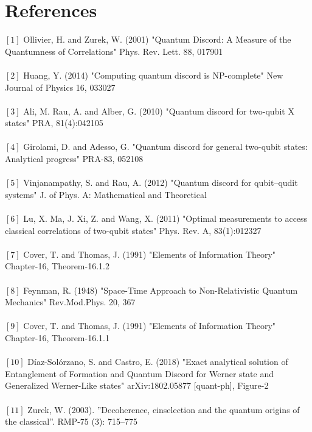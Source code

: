 \documentclass[8pt]{article}
\begin{document}
\section{References}
$[1]$ Ollivier, H. and Zurek, W. (2001) "Quantum Discord: A Measure of the Quantumness of Correlations" Phys. Rev. Lett. 88, 017901\\
\\
$[2]$ Huang, Y. (2014) "Computing quantum discord is NP-complete"  New Journal of Physics 16, 033027\\
\\
$[3]$ Ali, M. Rau, A. and Alber, G. (2010) "Quantum discord for two-qubit X states" PRA, 81(4):042105\\
\\
$[4]$ Girolami, D. and Adesso, G. "Quantum discord for general two-qubit states: Analytical progress" PRA-83, 052108\\
\\
$[5]$ Vinjanampathy, S. and Rau, A. (2012) "Quantum discord for qubit–qudit systems" J. of Phys. A: Mathematical and Theoretical\\
\\
$[6]$ Lu, X. Ma, J. Xi, Z. and Wang, X. (2011) "Optimal measurements to access classical correlations of two-qubit states" Phys. Rev. A, 83(1):012327\\
\\
$[7]$ Cover, T. and Thomas, J. (1991) "Elements of Information Theory" Chapter-16, Theorem-16.1.2\\
\\
$[8]$ Feynman, R. (1948) "Space-Time Approach to Non-Relativistic Quantum Mechanics" Rev.Mod.Phys. 20, 367\\
\\
$[9]$ Cover, T. and Thomas, J. (1991) "Elements of Information Theory" Chapter-16, Theorem-16.1.1\\
\\
$[10]$  Díaz-Solórzano, S. and Castro, E. (2018) "Exact analytical solution of Entanglement of Formation and Quantum Discord for Werner state and Generalized Werner-Like states" arXiv:1802.05877 [quant-ph], Figure-2\\
\\
$[11]$ Zurek, W. (2003). ”Decoherence, einselection and the quantum origins of the classical”. RMP-75 (3): 715–775
\end{document}
